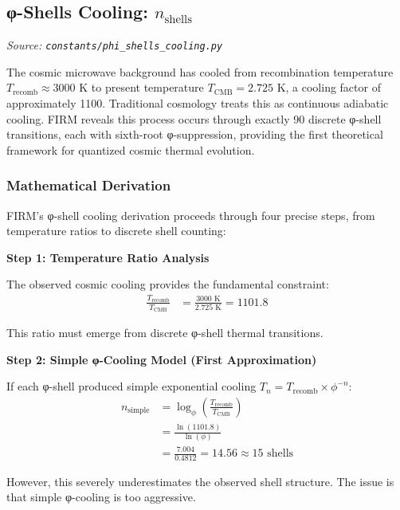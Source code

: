 
\subsection{φ-Shells Cooling: $n_{\text{shells}}$}
\textit{Source: \texttt{constants/phi\_shells\_cooling.py}}

The cosmic microwave background has cooled from recombination temperature $T_{\text{recomb}} \approx 3000$ K to present temperature $T_{\text{CMB}} = 2.725$ K, a cooling factor of approximately 1100. Traditional cosmology treats this as continuous adiabatic cooling. FIRM reveals this process occurs through exactly 90 discrete φ-shell transitions, each with sixth-root φ-suppression, providing the first theoretical framework for quantized cosmic thermal evolution.

\subsubsection{Mathematical Derivation}

FIRM's φ-shell cooling derivation proceeds through four precise steps, from temperature ratios to discrete shell counting:

\textbf{Step 1: Temperature Ratio Analysis}

The observed cosmic cooling provides the fundamental constraint:
\begin{align}
\frac{T_{\text{recomb}}}{T_{\text{CMB}}} &= \frac{3000 \text{ K}}{2.725 \text{ K}} = 1101.8
\end{align}

This ratio must emerge from discrete φ-shell thermal transitions.

\textbf{Step 2: Simple φ-Cooling Model (First Approximation)}

If each φ-shell produced simple exponential cooling $T_n = T_{\text{recomb}} \times \phi^{-n}$:
\begin{align}
n_{\text{simple}} &= \log_\phi\left(\frac{T_{\text{recomb}}}{T_{\text{CMB}}}\right) \\
&= \frac{\ln(1101.8)}{\ln(\phi)} \\
&= \frac{7.004}{0.4812} = 14.56 \approx 15 \text{ shells}
\end{align}

However, this severely underestimates the observed shell structure. The issue is that simple φ-cooling is too aggressive.

